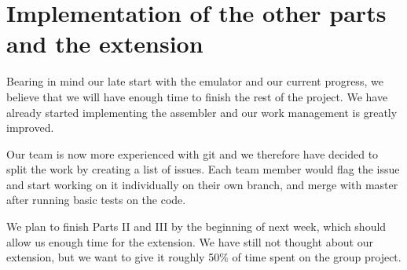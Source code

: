 \documentclass[11pt]{article}
\begin{document}
\section{Implementation of the other parts and the extension}

Bearing in mind our late start with the emulator and our current progress, we believe that we will have enough time to finish the rest of the project. We have already started implementing the assembler and our work management is greatly improved.
\par Our team is now more experienced with git and we therefore have decided to split the work by creating a list of issues. Each team member would flag the issue and start working on it individually on their own branch, and merge with master after running basic tests on the code. 
\par We plan to finish Parts II and III by the beginning of next week, which should allow us enough time for the extension. We have still not thought about our extension, but we want to give it roughly 50\% of time spent on the group project.
\end{document}
